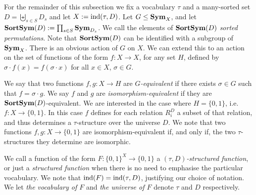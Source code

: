 \documentclass[../paper.tex]{subfiles}
\begin{document}
For the remainder of this subsection we fix a vocabulary $\tau$ and a
many-sorted set $D=\biguplus_{s \in S} D_{s}$
and let $X := \text{\upshape ind} (\tau, D)$. Let $G \leq \text{\textbf{Sym}}_{X}$, and let
$\text{\textbf{SortSym}}(D) := \prod_{s \in S} \text{\textbf{Sym}}_{D_{s}}$.  We call the elements of $\text{\textbf{SortSym}}(D)$ \emph{sorted permutations}. Note that
$\text{\textbf{SortSym}}(D)$ can be identified with a subgroup of $\text{\textbf{Sym}}_X$. There is an
obvious action of $G$ on $X$.  We can extend this to an action on the set of functions
of the form $f: X \rightarrow X$, for any set $H$, defined by $\sigma \cdot f(x)
= f(\sigma \cdot x)$ for all $x \in X$, $\sigma \in G$.

We say that two functions $f, g : X \rightarrow H$ are \emph{$G$-equivalent} if
there exists $\sigma \in G$ such that $f = \sigma \cdot g$. We say $f$ and $g$
are \emph{isomorphism-equivalent} if they are $\text{\textbf{SortSym}}(D)$-equivalent.
We are interested in the case where $H = \{0,1\}$, i.e.\ $f : X
\rightarrow \{0,1\}$. In this case $f$ defines for each relation $R^D_i$ a subset of that relation, and thus determines a $\tau$-structure over the universe $D$. We note that two functions $f, g: X \rightarrow
\{0,1\}$ are isomorphism-equivalent if, and only if, the two $\tau$-structures
they determine are isomorphic.

We call a function of the form $F:\{0,1\}^{X} \rightarrow \{0,1\}$ a
\emph{$(\tau, D)$-structured function}, or just a \emph{structured function}
when there is no need to emphasise the particular vocabulary.  We note that
$\text{\upshape ind}(F) = \text{\upshape ind}(\tau, D)$, justifying our choice of notation.  We let
\emph{the vocabulary of $F$} and \emph{the universe of $F$} denote
$\tau$ and $D$ respectively.


\end{document}
